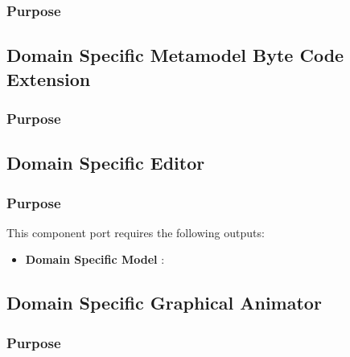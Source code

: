 \documentclass{gemoc} %
\begin{document}

\subsubsection{Purpose}



\subsection{Domain Specific Metamodel Byte Code Extension}


\subsubsection{Purpose}



\subsection{Domain Specific Editor}


\subsubsection{Purpose}


This component port requires the following outputs:
\begin{itemize}
  \item \textbf{Domain Specific Model} :
\end{itemize}

\subsection{Domain Specific Graphical Animator}


\subsubsection{Purpose}
\end{document}
